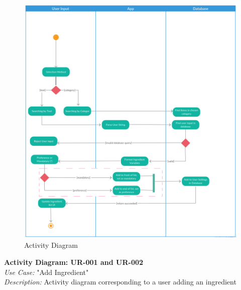\documentclass[12pt]{article}
\begin{document}
\begin{figure}
  \includegraphics[width=\linewidth]{activity.png}
  \caption{Activity Diagram}
  \label{fig:activity}
\end{figure}
 \begin{center}
   \textbf{Activity Diagram: UR-001 and UR-002} \\
   \textit{Use Case: } "Add Ingredient" \\
   \textit{Description: } Activity diagram corresponding to a user adding an ingredient \\
 \end{center}
\end{document}
